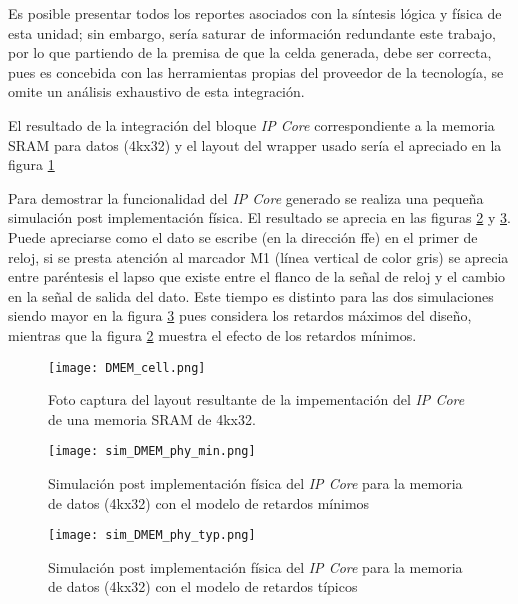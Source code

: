 Es posible presentar todos los reportes asociados con la síntesis lógica y física de esta unidad; sin embargo, sería saturar de información redundante este trabajo, por lo que partiendo de la premisa de que la celda generada, debe ser correcta, pues es concebida con las herramientas propias del proveedor de la tecnología, se omite un análisis exhaustivo de esta integración.

El resultado de la integración del bloque \textit{IP Core} correspondiente a la memoria SRAM para datos (4kx32) y el layout del wrapper usado sería el apreciado en la figura \ref{fig:dram_cell}

Para demostrar la funcionalidad del \textit{IP Core} generado se realiza una pequeña simulación post implementación física. El resultado se aprecia en las figuras \ref{fig:dram_sim_m} y \ref{fig:dram_sim_t}. Puede apreciarse como el dato se escribe (en la dirección ffe) en el primer de reloj, si se presta atención al marcador M1 (línea vertical de color gris) se aprecia entre paréntesis el lapso que existe entre el flanco de la señal de reloj y el cambio en la señal de salida del dato. Este tiempo es distinto para las dos simulaciones siendo mayor en la figura \ref{fig:dram_sim_t} pues considera los retardos máximos del diseño, mientras que la figura \ref{fig:dram_sim_m} muestra el efecto de los retardos mínimos.

\begin{figure}[h]
\texttt{[image: DMEM\_cell.png]}
\centering
\caption{Foto captura del layout resultante de la impementación del \textit{IP Core} de una memoria SRAM de 4kx32.}
\label{fig:dram_cell}
\end{figure}

\begin{figure}[h]
\texttt{[image: sim\_DMEM\_phy\_min.png]}
\centering
\caption{Simulación post implementación física del \textit{IP Core} para la memoria de datos (4kx32) con el modelo de retardos mínimos}
\label{fig:dram_sim_m}
\end{figure}

\begin{figure}[h]
\texttt{[image: sim\_DMEM\_phy\_typ.png]}
\centering
\caption{Simulación post implementación física del \textit{IP Core} para la memoria de datos (4kx32) con el modelo de retardos típicos}
\label{fig:dram_sim_t}
\end{figure}